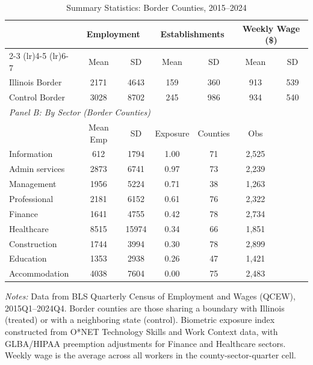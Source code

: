\begin{table}[htbp]
\centering
\caption{Summary Statistics: Border Counties, 2015--2024}
\label{tab:summary}
\begin{tabular}{lcccccc}
\toprule
 & \multicolumn{2}{c}{Employment} & \multicolumn{2}{c}{Establishments} & \multicolumn{2}{c}{Weekly Wage (\$)} \\
\cmidrule(lr){2-3} \cmidrule(lr){4-5} \cmidrule(lr){6-7}
 & Mean & SD & Mean & SD & Mean & SD \\
\midrule
Illinois Border & 2171 & 4643 & 159 & 360 & 913 & 539 \\
Control Border & 3028 & 8702 & 245 & 986 & 934 & 540 \\
\midrule
\multicolumn{7}{l}{\textit{Panel B: By Sector (Border Counties)}} \\
\midrule
 & Mean Emp & SD & Exposure & Counties & Obs & \\
\midrule
Information & 612 & 1794 & 1.00 & 71 & 2,525 & \\
Admin services & 2873 & 6741 & 0.97 & 73 & 2,239 & \\
Management & 1956 & 5224 & 0.71 & 38 & 1,263 & \\
Professional & 2181 & 6152 & 0.61 & 76 & 2,322 & \\
Finance & 1641 & 4755 & 0.42 & 78 & 2,734 & \\
Healthcare & 8515 & 15974 & 0.34 & 66 & 1,851 & \\
Construction & 1744 & 3994 & 0.30 & 78 & 2,899 & \\
Education & 1353 & 2938 & 0.26 & 47 & 1,421 & \\
Accommodation & 4038 & 7604 & 0.00 & 75 & 2,483 & \\
\bottomrule
\end{tabular}
\begin{tablenotes}[flushleft]
\small
\item \textit{Notes:} Data from BLS Quarterly Census of Employment and Wages (QCEW), 2015Q1--2024Q4. Border counties are those sharing a boundary with Illinois (treated) or with a neighboring state (control). Biometric exposure index constructed from O*NET Technology Skills and Work Context data, with GLBA/HIPAA preemption adjustments for Finance and Healthcare sectors. Weekly wage is the average across all workers in the county-sector-quarter cell.
\end{tablenotes}
\end{table}
